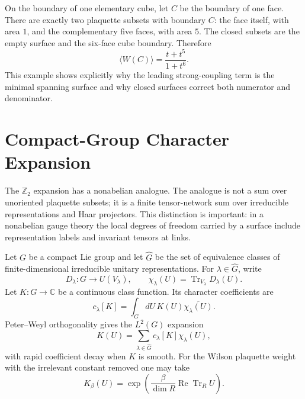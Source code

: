 \begin{example}
\label{ex:z2-one-cube-surface-polynomial}
On the boundary of one elementary cube, let \(C\) be the boundary of one
face.  There are exactly two plaquette subsets with boundary \(C\): the face
itself, with area \(1\), and the complementary five faces, with area \(5\).
The closed subsets are the empty surface and the six-face cube boundary.
Therefore
\begin{equation}
  \langle W(C)\rangle
  =
  \frac{t+t^5}{1+t^6}.
  \label{eq:z2-one-cube-wilson-polynomial}
\end{equation}
This example shows explicitly why the leading strong-coupling term is the
minimal spanning surface and why closed surfaces correct both numerator and
denominator.
\end{example}

\section{Compact-Group Character Expansion}
\label{sec:compact-group-character-expansion}

The \(\mathbb Z_2\) expansion has a nonabelian analogue.  The analogue is
not a sum over unoriented plaquette subsets; it is a finite tensor-network
sum over irreducible representations and Haar projectors.  This distinction
is important: in a nonabelian gauge theory the local degrees of freedom
carried by a surface include representation labels and invariant tensors at
links.

Let \(G\) be a compact Lie group and let \(\widehat G\) be the set of
equivalence classes of finite-dimensional irreducible unitary
representations.  For \(\lambda\in\widehat G\), write
\[
  D_\lambda:G\to U(V_\lambda),
  \qquad
  \chi_\lambda(U)=\operatorname{Tr}_{V_\lambda}D_\lambda(U).
\]
Let \(K:G\to\mathbb C\) be a continuous class function.  Its character
coefficients are
\begin{equation}
  c_\lambda[K]
  =
  \int_G dU\,K(U)\overline{\chi_\lambda(U)} .
  \label{eq:compact-character-coefficients}
\end{equation}
Peter--Weyl orthogonality gives the \(L^2(G)\) expansion
\begin{equation}
  K(U)=\sum_{\lambda\in\widehat G}c_\lambda[K]\chi_\lambda(U),
  \label{eq:compact-character-expansion}
\end{equation}
with rapid coefficient decay when \(K\) is smooth.  For the Wilson plaquette
weight with the irrelevant constant removed one may take
\begin{equation}
  K_\beta(U)=
  \exp\!\left(
    \frac{\beta}{\dim R}\operatorname{Re}\operatorname{Tr}_R U
  \right).
  \label{eq:compact-wilson-plaquette-weight}
\end{equation}

